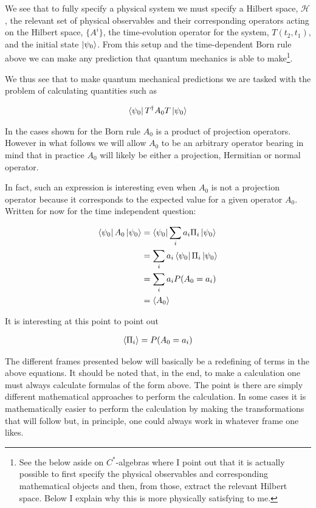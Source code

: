 \documentclass[12pt]{article}
\begin{document}
We see that to fully specify a physical system we must specify a Hilbert space, $\mathcal{H}$, the relevant set of physical observables and their corresponding operators acting on the Hilbert space, $\{A^i\}$, the time-evolution operator for the system, $T(t_2,t_1)$, and the initial state $\ket{\psi_0}$. From this setup and the time-dependent Born rule above we can make any prediction that quantum mechanics is able to make\footnote{See the below aside on $C^*$-algebras where I point out that it is actually possible to first specify the physical observables and corresponding mathematical objects and then, from those, extract the relevant Hilbert space. Below I explain why this is more physically satisfying to me.}.

We thus see that to make quantum mechanical predictions we are tasked with the problem of calculating quantities such as

\begin{align}
\bra{\psi_0}T^{\dag} A_0 T \ket{\psi_0}
\end{align}

In the cases shown for the Born rule $A_0$ is a product of projection operators. However in what follows we will allow $A_0$ to be an arbitrary operator bearing in mind that in practice $A_0$ will likely be either a projection, Hermitian or normal operator.

In fact, such an expression is interesting even when $A_0$ is not a projection operator because it corresponds to the expected value for a given operator $A_0$. Written for now for the time independent question:

\begin{align}
\bra{\psi_0}A_0\ket{\psi_0} &= \bra{\psi_0}\sum_i a_i \Pi_i  \ket{\psi_0}\\
&= \sum_i a_i \bra{\psi_0}\Pi_i \ket{\psi_0}\\
&= \sum_i a_i P(A_0 = a_i)\\
&= \Braket{A_0}
\end{align}

It is interesting at this point to point out

\begin{align}
\braket{\Pi_i} = P(A_0 = a_i)
\end{align}

The different frames presented below will basically be a redefining of terms in the above equations. It should be noted that, in the end, to make a calculation one must always calculate formulas of the form above. The point is there are simply different mathematical approaches to perform the calculation. In some cases it is mathematically easier to perform the calculation by making the transformations that will follow but, in principle, one could always work in whatever frame one likes.
\end{document}
